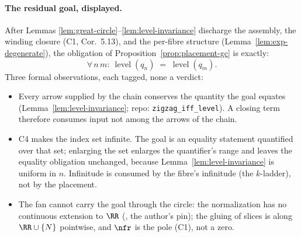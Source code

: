 \paragraph{The residual goal, displayed.}
After Lemmas \ref{lem:great-circle}--\ref{lem:level-invariance} discharge the
assembly, the winding closure \textup{(C1, Cor.~5.13)}, and the per-fibre
structure \textup{(}Lemma~\ref{lem:exp-degenerate}\textup{)}, the obligation
of Proposition~\ref{prop:placement-gc} is exactly:
\[
  \forall\, n\, m:\ \operatorname{level}(q_n) \;=\; \operatorname{level}(q_m).
\]
Three formal observations, each tagged, none a verdict:
\begin{itemize}
\item Every arrow supplied by the chain conserves the quantity the goal
  equates \textup{(}Lemma~\ref{lem:level-invariance}; repo:
  \texttt{zigzag\_iff\_level}\textup{)}. A closing term therefore consumes
  input not among the arrows of the chain.
\item \textup{C4} makes the index set infinite. The goal is an equality
  statement quantified over that set; enlarging the set enlarges the
  quantifier's range and leaves the equality obligation unchanged, because
  Lemma~\ref{lem:level-invariance} is uniform in $n$. Infinitude is consumed
  by the fibre's infinitude \textup{(}the $k$-ladder\textup{)}, not by the
  placement.
\item The fan cannot carry the goal through the circle: the normalization has
  no continuous extension to $\RR$ \textup{(\cite[Rem.~2.1]{GPVwind},
  the author's pin)}; the gluing of slices is along $\RR \cup \{N\}$
  pointwise, and $\nfr$ is the pole \textup{(C1)}, not a zero.
\end{itemize}
